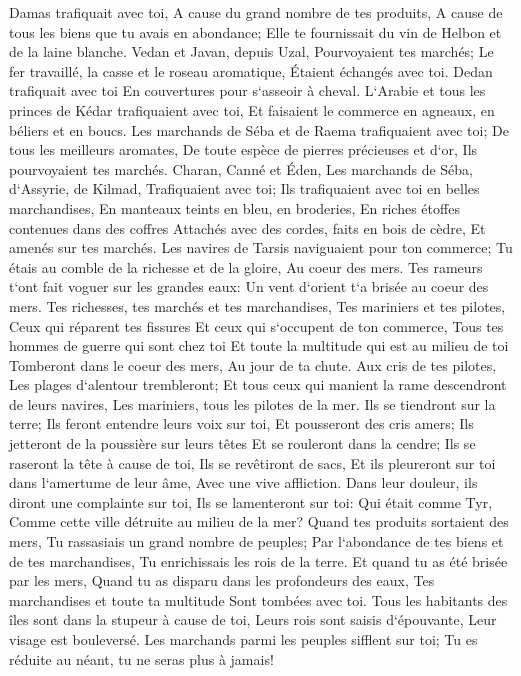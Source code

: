 \verse Damas trafiquait avec toi, A cause du grand nombre de tes produits, A cause de tous les biens que tu avais en abondance; Elle te fournissait du vin de Helbon et de la laine blanche. 
\verse Vedan et Javan, depuis Uzal, Pourvoyaient tes marchés; Le fer travaillé, la casse et le roseau aromatique, Étaient échangés avec toi. 
\verse Dedan trafiquait avec toi En couvertures pour s`asseoir à cheval. 
\verse L`Arabie et tous les princes de Kédar trafiquaient avec toi, Et faisaient le commerce en agneaux, en béliers et en boucs. 
\verse Les marchands de Séba et de Raema trafiquaient avec toi; De tous les meilleurs aromates, De toute espèce de pierres précieuses et d`or, Ils pourvoyaient tes marchés. 
\verse Charan, Canné et Éden, Les marchands de Séba, d`Assyrie, de Kilmad, Trafiquaient avec toi; 
\verse Ils trafiquaient avec toi en belles marchandises, En manteaux teints en bleu, en broderies, En riches étoffes contenues dans des coffres Attachés avec des cordes, faits en bois de cèdre, Et amenés sur tes marchés. 
\verse Les navires de Tarsis naviguaient pour ton commerce; Tu étais au comble de la richesse et de la gloire, Au coeur des mers. 
\verse Tes rameurs t`ont fait voguer sur les grandes eaux: Un vent d`orient t`a brisée au coeur des mers. 
\verse Tes richesses, tes marchés et tes marchandises, Tes mariniers et tes pilotes, Ceux qui réparent tes fissures Et ceux qui s`occupent de ton commerce, Tous tes hommes de guerre qui sont chez toi Et toute la multitude qui est au milieu de toi Tomberont dans le coeur des mers, Au jour de ta chute. 
\verse Aux cris de tes pilotes, Les plages d`alentour trembleront; 
\verse Et tous ceux qui manient la rame descendront de leurs navires, Les mariniers, tous les pilotes de la mer. Ils se tiendront sur la terre; 
\verse Ils feront entendre leurs voix sur toi, Et pousseront des cris amers; Ils jetteront de la poussière sur leurs têtes Et se rouleront dans la cendre; 
\verse Ils se raseront la tête à cause de toi, Ils se revêtiront de sacs, Et ils pleureront sur toi dans l`amertume de leur âme, Avec une vive affliction. 
\verse Dans leur douleur, ils diront une complainte sur toi, Ils se lamenteront sur toi: Qui était comme Tyr, Comme cette ville détruite au milieu de la mer? 
\verse Quand tes produits sortaient des mers, Tu rassasiais un grand nombre de peuples; Par l`abondance de tes biens et de tes marchandises, Tu enrichissais les rois de la terre. 
\verse Et quand tu as été brisée par les mers, Quand tu as disparu dans les profondeurs des eaux, Tes marchandises et toute ta multitude Sont tombées avec toi. 
\verse Tous les habitants des îles sont dans la stupeur à cause de toi, Leurs rois sont saisis d`épouvante, Leur visage est bouleversé. 
\verse Les marchands parmi les peuples sifflent sur toi; Tu es réduite au néant, tu ne seras plus à jamais! 

